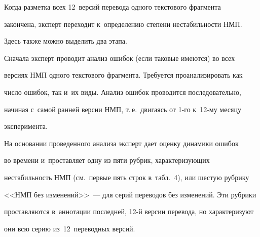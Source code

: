   Когда разметка всех 12~версий перевода одного текстового фрагмента 


закончена, эксперт переходит к~определению степени нестабильности НМП. 


Здесь также можно выделить два этапа.


  


  Сначала эксперт проводит анализ ошибок (если таковые имеются) во всех 


версиях НМП одного текстового фрагмента. Требуется проанализировать как 


число ошибок, так и~их виды. Анализ ошибок проводится последовательно, 


начиная с~самой ранней версии НМП, т.\,е.\ двигаясь от 1-го к~12-му месяцу 


эксперимента.


  


  На основании проведенного анализа эксперт дает оценку динамики ошибок 


во времени и~проставляет одну из пяти рубрик, характеризующих 


нестабильность НМП (см.\ первые пять строк в~табл.~4), или шестую рубрику 


<<НМП без изменений>>~--- для серий переводов без изменений. Эти рубрики 


проставляются в~аннотации последней, 12-й версии перевода, но характеризуют 


они всю серию из~12~переводных версий.


  


